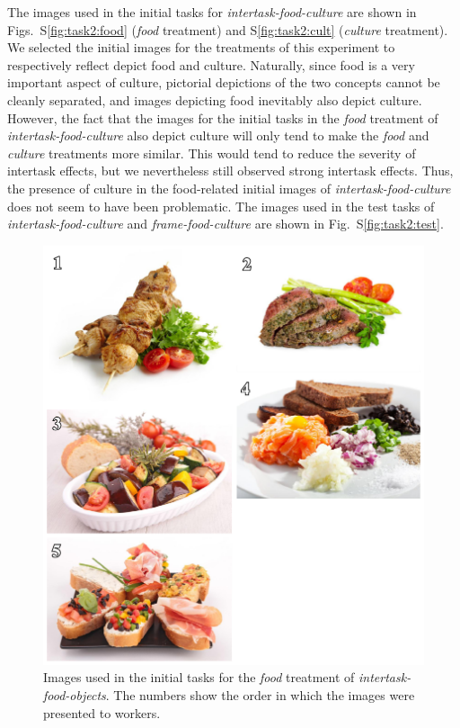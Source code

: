 \documentclass[12pt]{article}
\begin{document}
The images used in the initial tasks
for \textit{intertask-food-culture} are shown in Figs.~S\ref{fig:task2:food} 
(\textit{food} treatment) and S\ref{fig:task2:cult} 
(\textit{culture} treatment).
We selected the initial images for the treatments of this experiment to 
respectively reflect depict food and culture.
Naturally, since food is a very
important aspect of culture, pictorial depictions of the two concepts 
cannot be cleanly separated,
and images depicting food inevitably also depict culture.
However, the fact that the images for the initial tasks in the 
\textit{food} treatment 
of \textit{intertask-food-culture} also depict culture
will only tend to make the \textit{food} and \textit{culture}
treatments more similar. 
This would tend to reduce the severity of intertask 
effects, but we nevertheless still observed strong intertask effects.
Thus, the presence of culture in the food-related initial images of 
\textit{intertask-food-culture} does not seem to have been problematic.
The images used in the test tasks of \textit{intertask-food-culture} and
\textit{frame-food-culture} are shown in Fig.~S\ref{fig:task2:test}.

\begin{figure}
	\begin{center}
	\includegraphics{figs/task1-food.pdf}
	\end{center}
	\caption{
		Images used in the initial tasks for the
		\textit{food} treatment of \textit{intertask-food-objects}.  
		The numbers show the order in which the 
		images were presented to workers.
	}
	\label{fig:task1:food}
\end{figure}
\end{document}
